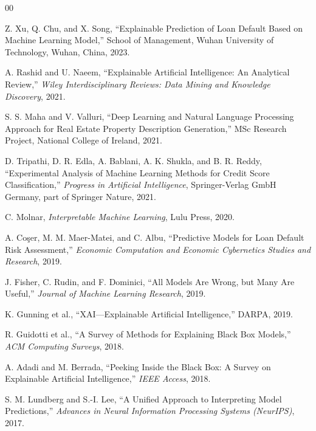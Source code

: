 
\begin{thebibliography}{00}

 Z. Xu, Q. Chu, and X. Song, ``Explainable Prediction of Loan Default Based on Machine Learning Model,'' School of Management, Wuhan University of Technology, Wuhan, China, 2023.

 A. Rashid and U. Naeem, ``Explainable Artificial Intelligence: An Analytical Review,'' \textit{Wiley Interdisciplinary Reviews: Data Mining and Knowledge Discovery}, 2021.

 S. S. Maha and V. Valluri, ``Deep Learning and Natural Language Processing Approach for Real Estate Property Description Generation,'' MSc Research Project, National College of Ireland, 2021.

 D. Tripathi, D. R. Edla, A. Bablani, A. K. Shukla, and B. R. Reddy, ``Experimental Analysis of Machine Learning Methods for Credit Score Classification,'' \textit{Progress in Artificial Intelligence}, Springer-Verlag GmbH Germany, part of Springer Nature, 2021.

 C. Molnar, \textit{Interpretable Machine Learning}, Lulu Press, 2020.

 A. Coşer, M. M. Maer-Matei, and C. Albu, ``Predictive Models for Loan Default Risk Assessment,'' \textit{Economic Computation and Economic Cybernetics Studies and Research}, 2019.

 J. Fisher, C. Rudin, and F. Dominici, ``All Models Are Wrong, but Many Are Useful,'' \textit{Journal of Machine Learning Research}, 2019.

 K. Gunning et al., ``XAI---Explainable Artificial Intelligence,'' DARPA, 2019.

 R. Guidotti et al., ``A Survey of Methods for Explaining Black Box Models,'' \textit{ACM Computing Surveys}, 2018.

 A. Adadi and M. Berrada, ``Peeking Inside the Black Box: A Survey on Explainable Artificial Intelligence,'' \textit{IEEE Access}, 2018.

 S. M. Lundberg and S.-I. Lee, ``A Unified Approach to Interpreting Model Predictions,'' \textit{Advances in Neural Information Processing Systems (NeurIPS)}, 2017.


\end{thebibliography}
